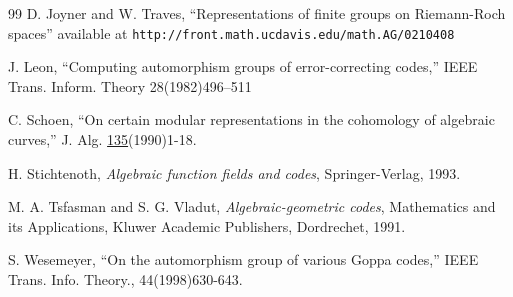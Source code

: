 \documentclass[12pt]{article}
\numberwithin{equation}{section}
\begin{document}
\begin{thebibliography}{99}
 D. Joyner and W. Traves, 
``Representations of finite groups on Riemann-Roch
spaces'' available at
\verb+http://front.math.ucdavis.edu/math.AG/0210408+

%
%

 J. Leon, ``Computing automorphism 
groups of error-correcting codes,'' IEEE Trans. 
Inform. Theory 28(1982)496--511



%
%

C. Schoen, ``On certain modular representations 
in the cohomology 
of algebraic curves,'' J. Alg. \underline{135}(1990)1-18.


%

 H. Stichtenoth, {\it Algebraic function
fields and codes}, Springer-Verlag, 1993.

M. A. Tsfasman and S. G. Vladut, {\it Algebraic-geometric codes},
Mathematics and its Applications, 
Kluwer Academic Publishers, Dordrechet, 1991.

 S. Wesemeyer, 
``On the automorphism group of 
various Goppa codes,''
IEEE Trans. Info. Theory., 44(1998)630-643.
\end{thebibliography}
\end{document}
